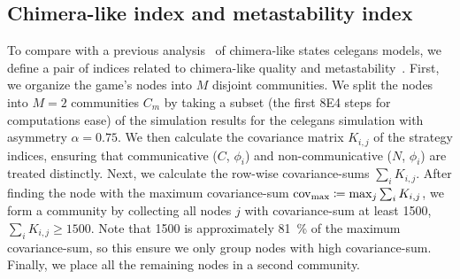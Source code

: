 \documentclass[pdflatex,lineno,referee,sn-nature]{sn-jnl}
\begin{document}
\subsection{Chimera-like index and metastability index}\label{sec:chimera-metastability-def}
To compare with a previous analysis~\citep{hizanidis2016chimera} of
chimera-like states \gls{celegans} models,
we define a pair of indices related to
chimera-like quality and metastability~\citep{shanahan2010metastable}.
First, we organize the game's nodes
into $M$ disjoint communities.
We split the nodes into $M=2$ communities $C_m$
by taking a subset
(the first \num{8E4} steps for computations ease)
of the simulation results
for the \gls{celegans} simulation with asymmetry $\alpha = \num{0.75}$.
We then calculate the covariance matrix $K_{i,j}$ of the strategy indices,
ensuring that communicative ($C$, $\phi_i$)
and non-communicative ($N$, $\phi_i$) are treated distinctly.
Next, we calculate the row-wise covariance-sums  $\sum_i K_{i,j}$.
After finding the node with the maximum covariance-sum
$\operatorname{cov}_{\text{max}} \coloneqq \max_j{\sum_i K_{i,j}}$,
we form a community by collecting all nodes $j$ with covariance-sum
at least \num{1500}, $\sum_i K_{i,j} \ge 1500$.
Note that \num{1500} is approximately \SI{81}{\percent}
of the maximum covariance-sum,
so this ensure we only group nodes with high covariance-sum.
Finally, we place all the remaining nodes in a second community.
\end{document}
